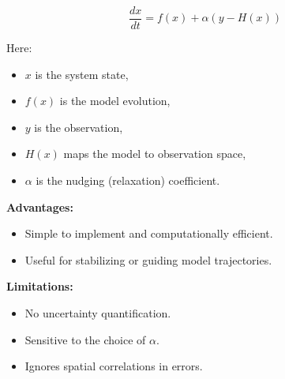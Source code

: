 \documentclass[a4paper]{article}
\begin{document}
\[
\frac{dx}{dt} = f(x) + \alpha \left( y - H(x) \right)
\]

Here:\\

\begin{itemize}
  \item $x$ is the system state,
  \item $f(x)$ is the model evolution,
  \item $y$ is the observation,
  \item $H(x)$ maps the model to observation space,
  \item $\alpha$ is the nudging (relaxation) coefficient.
\end{itemize}

\textbf{Advantages:}\\

\begin{itemize}
  \item Simple to implement and computationally efficient.
  \item Useful for stabilizing or guiding model trajectories.
\end{itemize}

\textbf{Limitations:}\\

\begin{itemize}
  \item No uncertainty quantification.
  \item Sensitive to the choice of $\alpha$.
  \item Ignores spatial correlations in errors.
\end{itemize}

\end{document}
